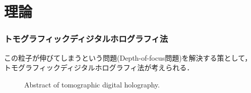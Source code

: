 \section{理論}
\subsubsection{トモグラフィックディジタルホログラフィ法}
この粒子が伸びてしまうという問題(Depth-of-focus問題)を解決する策として，トモグラフィックディジタルホログラフィ法が考えられる．


\begin{figure}[H]
\caption{Abstract of tomographic digital holography.}
\end{figure}
